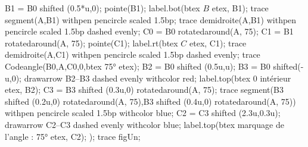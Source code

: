 \begin{changemargin}{0mm}{-20mm}
\begin{methode}
\begin{Geometrie}[CoinHD={(8.5u,5u)}]
                B1 = B0 shifted (0.5*u,0);
                pointe(B1);
                label.bot(btex $B$ etex, B1);
                trace segment(A,B1) withpen pencircle scaled 1.5bp;
                trace demidroite(A,B1) withpen pencircle scaled 1.5bp dashed evenly;
                C0 = B0 rotatedaround(A, 75);
                C1 = B1 rotatedaround(A, 75);
                pointe(C1);
                label.rt(btex $C$ etex, C1);
                trace demidroite(A,C1) withpen pencircle scaled 1.5bp dashed evenly;
                trace Codeangle(B0,A,C0,0,btex \ang{75} etex);
                B2 = B0 shifted (0.5u,u);
                B3 = B0 shifted(-u,0);
                drawarrow B2--B3 dashed evenly withcolor red;
                label.top(btex {\red $0$ intérieur} etex, B2);
                C3 = B3 shifted (0.3u,0) rotatedaround(A, 75);
                trace segment(B3 shifted (0.2u,0) rotatedaround(A, 75),B3 shifted (0.4u,0) rotatedaround(A, 75)) withpen pencircle scaled 1.5bp withcolor blue;
                C2 = C3 shifted (2.3u,0.3u);
                drawarrow C2--C3 dashed evenly withcolor blue;
                label.top(btex {\blue marquage de l'angle : \ang{75}} etex, C2);
            );
            trace figUn;
        \end{Geometrie}
    \end{methode}
\end{changemargin}

